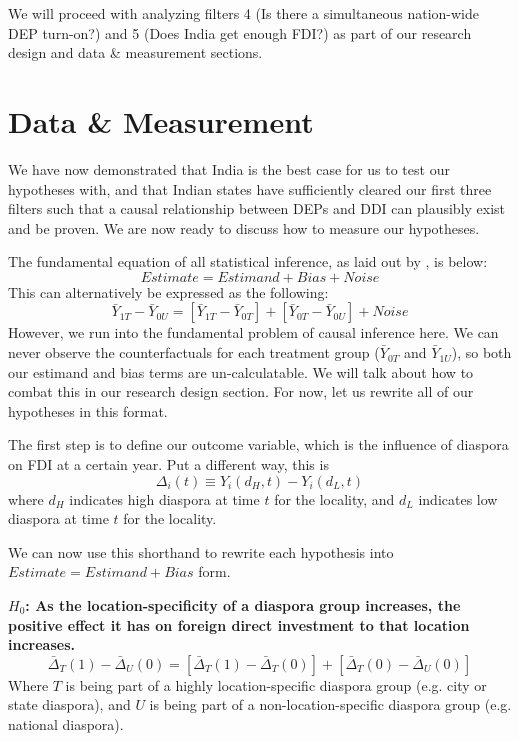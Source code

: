\documentclass[doublespace,nopageskip]{UVAthesis}
\begin{document}
    We will proceed with analyzing filters 4 (Is there a simultaneous nation-wide DEP turn-on?) and 5 (Does India get enough FDI?) as part of our research design and data \& measurement sections. 

	\chapter{Data \& Measurement} \label{ch:data & measurement}
    We have now demonstrated that India is the best case for us to test our hypotheses with, and that Indian states have sufficiently cleared our first three filters such that a causal relationship between DEPs and DDI can plausibly exist and be proven. We are now ready to discuss how to measure our hypotheses.

    The fundamental equation of all statistical inference, as laid out by \citet{bueno_de_mesquita_thinking_2021}, is below:
\[Estimate = Estimand + Bias + Noise\]
   This can alternatively be expressed as the following:  \[\bar{Y}_{1T}-\bar{Y}_{0U} = 
    [\bar{Y}_{1T}-\bar{Y}_{0T}] + 
    [\bar{Y}_{0T}-\bar{Y}_{0U}] + Noise
    \]
    However, we run into the fundamental problem of causal inference here. We can never observe the counterfactuals for each treatment group ($\bar{Y}_{0T}$ and $\bar{Y}_{1U}$), so both our estimand and bias terms are un-calculatable. We will talk about how to combat this in our research design section. For now, let us rewrite all of our hypotheses in this format. 
    
    The first step is to define our outcome variable, which is the influence of diaspora on FDI at a certain year. Put a different way, this is \[
\Delta_i(t) \equiv Y_i(d_H,t)-Y_i(d_L,t)
\]
    where $d_H$ indicates high diaspora at time $t$ for the locality, and $d_L$ indicates low diaspora at time $t$ for the locality. 

    We can now use this shorthand to rewrite each hypothesis into $Estimate = Estimand + Bias $ form.
    
\textbf{$H_0$:  As the location-specificity of a diaspora group increases, the positive effect it has on foreign direct investment to that location increases.}
\[
\bar{\Delta}_T(1)-\bar{\Delta}_U(0)
=
\left[\bar{\Delta}_T(1)-\bar{\Delta}_T(0)\right]
+
\left[\bar{\Delta}_T(0)-\bar{\Delta}_U(0)\right]
\]
Where $T$ is being part of a highly location-specific diaspora group (e.g. city or state diaspora), and $U$ is being part of a non-location-specific diaspora group (e.g. national diaspora).
\end{document}
